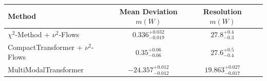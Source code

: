     \begin{tabular}{lccc}
        \toprule
        Method & Mean Deviation $m(W)$ & Resolution $m(W)$ \\
        \midrule
        $\chi^2$-Method + $\nu^2$-Flows & $0.336^{+0.032}_{-0.019}$ & $27.8^{+0.4}_{-0.3}$ \\
        CompactTransformer + $\nu^2$-Flows & $0.35^{+0.06}_{-0.06}$ & $27.6^{+0.5}_{-0.4}$ \\
        MultiModalTransformer & $-24.357^{+0.012}_{-0.012}$ & $19.863^{+0.027}_{-0.017}$ \\
        \bottomrule
    \end{tabular}